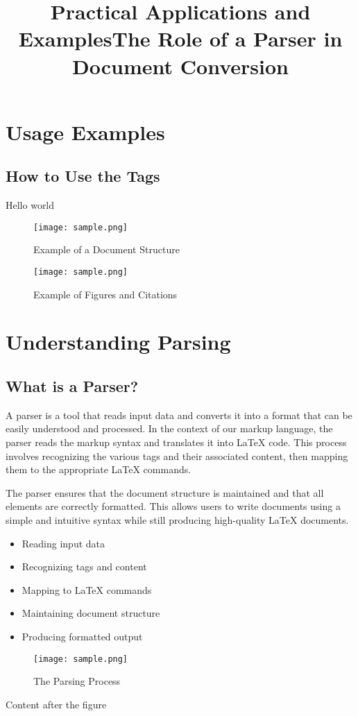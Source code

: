 \documentclass[oneside]{book}
\begin{document}
\chapter{Usage Examples}
\section{How to Use the Tags}
\title{Practical Applications and Examples}
Hello world\par
\begin{figure}[h]
\centering
\texttt{[image: sample.png]}
\caption{Example of a Document Structure}
\texttt{[image: sample.png]}
\caption{Example of Figures and Citations}
\end{figure}
\newpage
\chapter{Understanding Parsing}
\section{What is a Parser?}
\title{The Role of a Parser in Document Conversion}
A parser is a tool that reads input data and converts it into a format that can be easily understood and processed. In the context of our markup language, the parser reads the markup syntax and translates it into LaTeX code. This process involves recognizing the various tags and their associated content, then mapping them to the appropriate LaTeX commands.\par
The parser ensures that the document structure is maintained and that all elements are correctly formatted. This allows users to write documents using a simple and intuitive syntax while still producing high-quality LaTeX documents.\par
\begin{itemize}
\item Reading input data
\item Recognizing tags and content
\item Mapping to LaTeX commands
\item Maintaining document structure
\item Producing formatted output
\end{itemize}
\begin{figure}[h]
\centering
\texttt{[image: sample.png]}
\caption{The Parsing Process}
\end{figure}Content after the figure\par
\end{document}
